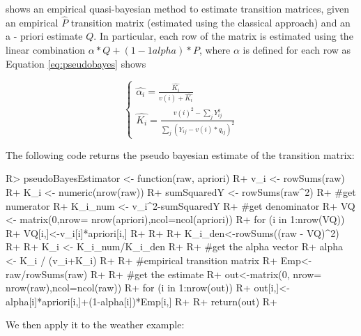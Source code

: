 \documentclass[
  nojss]{jss}
\begin{document}
\cite{Hu2002} shows an empirical quasi-bayesian method to estimate transition matrices, given an empirical \(\hat{P}\) transition matrix (estimated using the classical approach) and an a - priori estimate \(Q\). In particular, each row of the matrix is estimated using the linear combination \(\alpha*Q+\left(1-1alpha\right)*P\), where \(\alpha\) is defined for each row as Equation \ref{eq:pseudobayes} shows

\begin{equation}
\left\{\begin{matrix}
\hat{\alpha_i}=\frac{\hat{K_i}}{v\left(i \right )+\hat{K_i}}\\ 
\hat{K_i}=\frac{v\left(i \right)^2 - \sum_{j}Y_{ij}^2}{\sum_{j}(Y_{ij}-v\left(i \right)*q_{ij})^2}
\end{matrix}\right.
\label{eq:pseudobayes}
\end{equation}

The following code returns the pseudo bayesian estimate of the transition matrix:

\begin{CodeChunk}

\begin{CodeInput}
R> pseudoBayesEstimator <- function(raw, apriori){
R+   v_i <- rowSums(raw) 
R+   K_i <- numeric(nrow(raw))
R+   sumSquaredY <- rowSums(raw^2)
R+   #get numerator
R+   K_i_num <- v_i^2-sumSquaredY
R+   #get denominator
R+   VQ <- matrix(0,nrow= nrow(apriori),ncol=ncol(apriori))
R+   for (i in 1:nrow(VQ)) {
R+     VQ[i,]<-v_i[i]*apriori[i,]
R+   }
R+   
R+   K_i_den<-rowSums((raw - VQ)^2)
R+   
R+   K_i <- K_i_num/K_i_den
R+   
R+   #get the alpha vector
R+   alpha <- K_i / (v_i+K_i)
R+   
R+   #empirical transition matrix
R+   Emp<-raw/rowSums(raw)
R+   
R+   #get the estimate
R+   out<-matrix(0, nrow= nrow(raw),ncol=ncol(raw))
R+   for (i in 1:nrow(out)) {
R+     out[i,]<-alpha[i]*apriori[i,]+(1-alpha[i])*Emp[i,]
R+   }
R+   return(out)
R+ }
\end{CodeInput}
\end{CodeChunk}

We then apply it to the weather example:
\end{document}
